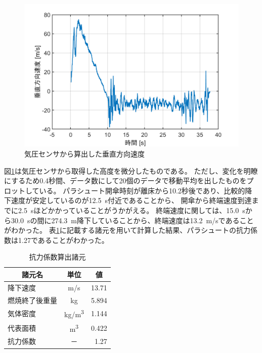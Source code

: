\documentclass[a4paper,11pt,titlepage,uplatex]{jsarticle}
\begin{document}
\begin{figure}[H]
    \centering
    \includegraphics[width=0.7\linewidth]{pic_sim/hight_d.png}
    \caption{気圧センサから算出した垂直方向速度}
    \label{fig:suityoku_kiatu}
\end{figure}

図\ref{fig:suityoku_kiatu}は気圧センサから取得した高度を微分したものである。
ただし、変化を明瞭にするため0.4秒間、データ数にして20個のデータで移動平均を出したものをプロットしている。
パラシュート開傘時刻が離床から10.2秒後であり、比較的降下速度が安定しているのが\SI{12.5}{s}付近であることから、
開傘から終端速度到達までに\SI{2.5}{s}ほどかかっていることがうかがえる。
終端速度に関しては、\SI{15.0}{s}から\SI{30.0}{s}の間に\SI{274.3}{m}降下していることから、終端速度は\SI{13.2}{m/s}であることがわかった。
表\ref{tab:kouryoku_shogen}に記載する諸元を用いて計算した結果、パラシュートの抗力係数は1.27であることがわかった。

\begin{table}[H]
    \centering
    \caption{抗力係数算出諸元}
    \label{tab:kouryoku_shogen}
    \begin{tabular}{lcr}
        \toprule
        \multicolumn{1}{c}{諸元名} & 単位          & \multicolumn{1}{c}{値} \\
        \midrule
        降下速度                    & \si{m/s}    & 13.71                 \\
        燃焼終了後重量                 & \si{kg}     & 5.894                 \\
        気体密度                    & \si{kg/m^3} & 1.144                 \\
        代表面積                    & \si{m^3}    & 0.422                 \\
        \midrule
        抗力係数                    & －           & 1.27                  \\
        \bottomrule
    \end{tabular}
\end{table}
\end{document}
